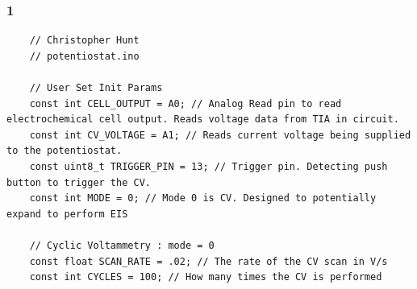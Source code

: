\documentclass{article}
\begin{document}
\subsubsection*{1}
\begin{lstlisting}
    // Christopher Hunt
    // potentiostat.ino
    
    // User Set Init Params
    const int CELL_OUTPUT = A0; // Analog Read pin to read electrochemical cell output. Reads voltage data from TIA in circuit.
    const int CV_VOLTAGE = A1; // Reads current voltage being supplied to the potentiostat.
    const uint8_t TRIGGER_PIN = 13; // Trigger pin. Detecting push button to trigger the CV.
    const int MODE = 0; // Mode 0 is CV. Designed to potentially expand to perform EIS
    
    // Cyclic Voltammetry : mode = 0
    const float SCAN_RATE = .02; // The rate of the CV scan in V/s
    const int CYCLES = 100; // How many times the CV is performed
    

\end{lstlisting}
\end{document}
